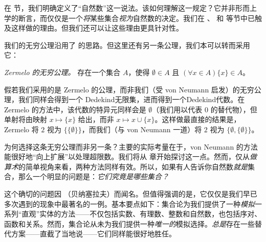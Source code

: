 \documentclass[../../../include/open-logic-section]{subfiles}
\begin{document}


在  节，我们明确定义了“自然数”这一说法。该如何理解这一规定？它并非形而上学的断言，而仅仅是一个\emph{将}某些集合\emph{视为}自然数的决定。我们在 、 和  等节中已触及这样做的理由。但我们还可以让这些理由更具针对性。

我们的无穷公理沿用了 \citet{VonNeumann1925}的思路。但这里还有另一条公理，我们本可以转而采用它：

\begin{defish}
\emph{Zermelo\citeyear{Zermelo1908Untersuchungen} 的无穷公理。} 存在一个集合 $A$，使得 $\emptyset \in A$ 且 $(\forall x \in A)\{x\} \in A$。
\end{defish}

假若我们采用的是 Zermelo 的公理，而非我们（受 von Neumann 启发）的无穷公理，我们同样会得到一个 Dedekind无限集，进而得到一个Dedekind代数。在 Zermelo 的方法中，该代数的特异元同样会是 $\emptyset$（我们用以代表 $0$ 的替代物），但单射将由映射 $x \mapsto \{x\}$ 给出，而非 $x \mapsto x \cup \{x\}$。这样做最直接的结果是，Zermelo 将 $2$ 视为 $\{\{\emptyset\}\}$，而我们（与 von Neumann 一道）将 $2$ 视为 $\{\emptyset, \{\emptyset\}\}$。

为何选择这条无穷公理而非另一条？主要的实际考量在于，von Neumann 的方法能很好地“向上扩展”以处理超限数。我们将从  章开始探讨这一点。然而，仅从\emph{做算术}的简单视角来看，两种方法同样有效。所以，如果有人告诉你自然数\emph{就是}集合，那么一个明显的问题是：\emph{它们究竟是哪些集合？}

这个确切的问题因 \citet{Benacerraf1965}（贝纳塞拉夫）而闻名。但值得强调的是，它仅仅是我们早已多次遇到的现象中最著名的一例。基本要点如下：集合论为我们提供了一种\emph{模拟}一系列“直观”实体的方法——不仅包括实数、有理数、整数和自然数，也包括序对、函数和关系。然而，集合论从未为我们提供一种\emph{唯一的}模拟选择。\emph{总是}存在一些替代方案——直截了当地说——它们同样能很好地胜任。
\end{document}
